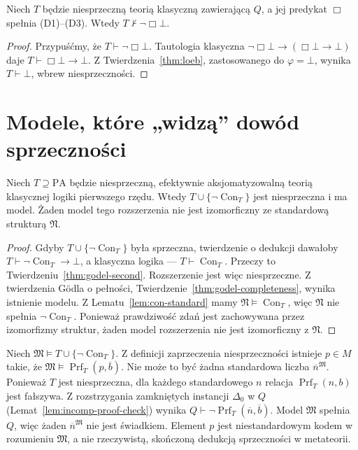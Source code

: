 \begin{wniosek}
\label{cor:godel-from-loeb}
Niech $T$ będzie niesprzeczną teorią klasyczną
zawierającą $Q$, a jej predykat $\Box$
spełnia (D1)--(D3). Wtedy
$T\nvdash\neg\Box\bot$.
\end{wniosek}
\begin{proof}
Przypuśćmy, że $T\vdash\neg\Box\bot$.
Tautologia klasyczna
$\neg\Box\bot\to(\Box\bot\to\bot)$
daje $T\vdash\Box\bot\to\bot$.
Z Twierdzenia~\ref{thm:loeb}, zastosowanego
do $\varphi=\bot$, wynika $T\vdash\bot$,
wbrew niesprzeczności.
\end{proof}

\section{Modele, które „widzą” dowód sprzeczności}
\begin{twierdzenie}
\label{thm:models-not-con}
Niech $T\supseteq\mathrm{PA}$ będzie niesprzeczną,
efektywnie aksjomatyzowalną teorią klasycznej logiki
pierwszego rzędu. Wtedy
$T\cup\{\neg\operatorname{Con}_T\}$ jest
niesprzeczna i ma model. Żaden model tego rozszerzenia
nie jest izomorficzny ze standardową strukturą $\mathfrak N$.
\end{twierdzenie}
\begin{proof}
Gdyby $T\cup\{\neg\operatorname{Con}_T\}$
była sprzeczna, twierdzenie o dedukcji dawałoby
$T\vdash\neg\operatorname{Con}_T\to\bot$,
a klasyczna logika --- $T\vdash\operatorname{Con}_T$.
Przeczy to Twierdzeniu~\ref{thm:godel-second}.
Rozszerzenie jest więc niesprzeczne.
Z twierdzenia Gödla o pełności,
Twierdzenie~\ref{thm:godel-completeness}, wynika istnienie modelu.
Z Lematu~\ref{lem:con-standard} mamy
$\mathfrak N\models\operatorname{Con}_T$,
więc $\mathfrak N$ nie spełnia
$\neg\operatorname{Con}_T$.
Ponieważ prawdziwość zdań jest zachowywana
przez izomorfizmy struktur, żaden model
rozszerzenia nie jest izomorficzny z $\mathfrak N$.
\end{proof}

\begin{uwaga}
Niech $\mathfrak M\models
T\cup\{\neg\operatorname{Con}_T\}$.
Z definicji zaprzeczenia niesprzeczności
istnieje $p\in M$ takie, że
$\mathfrak M\models\operatorname{Prf}_T(p,\overline b)$.
Nie może to być żadna standardowa liczba
$\overline n^{\mathfrak M}$.
Ponieważ $T$ jest niesprzeczna,
dla każdego standardowego $n$ relacja
$\operatorname{Prf}_T(n,b)$ jest fałszywa.
Z rozstrzygania zamkniętych instancji
$\Delta_0$ w $Q$
(Lemat~\ref{lem:incomp-proof-check}) wynika
$Q\vdash\neg\operatorname{Prf}_T(\overline n,\overline b)$.
Model $\mathfrak M$ spełnia $Q$, więc żaden
$\overline n^{\mathfrak M}$ nie jest świadkiem.
Element $p$ jest niestandardowym kodem w
rozumieniu $\mathfrak M$, a nie rzeczywistą,
skończoną dedukcją sprzeczności w metateorii.
\end{uwaga}

